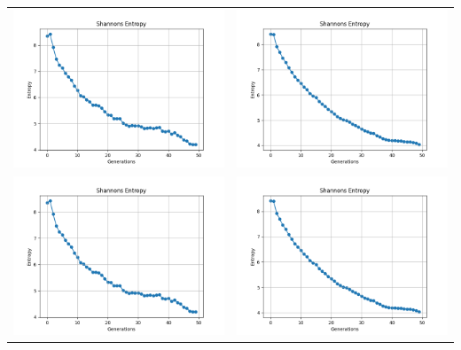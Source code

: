 \documentclass[]{article}
\begin{document}
			\newpage
			\begin{table}[!h]
				\centering
				\begin{tabular}{c c}
					\includegraphics[width=9cm]{Imagenes/Entropia_100x100_50Gen.png} & \includegraphics[width=9cm]{Imagenes/Entropia_300x300_50Gen.png} \\
					\includegraphics[width=9cm]{Imagenes/Entropia_100x100_50Gen.png} & \includegraphics[width=9cm]{Imagenes/Entropia_300x300_50Gen.png} 

\end{tabular}
\end{table}
\end{document}
